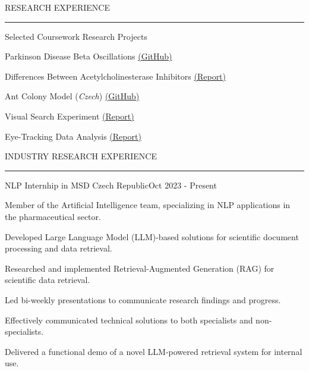 \documentclass{resume} %
\renewenvironment{rSection}[1]{
\sectionskip
\textcolor{CarnegieMellonRed}{\MakeUppercase{#1}}
\sectionlineskip
\hrule
\begin{list}{}{
\setlength{\leftmargin}{1.5em}
}
\item[]
}{
\end{list}
}
\begin{document}
\begin{rSection}{Research Experience}
\newpage

\begin{rProject}{\large Selected Coursework Research Projects}{}
{}{}{}
    \item Parkinson Disease Beta Oscillations 
    {\href{https://github.com/dbeinhauer/parkinson_disease_project}{(GitHub)}}
    \item Differences Between Acetylcholinesterase Inhibitors
    {\href{https://github.com/dbeinhauer/acetylcholinester_inhibitors/blob/main/TeX/main.pdf}{(Report)}}
    \item Ant Colony Model (\emph{Czech})
    {\href{https://github.com/dbeinhauer/ant_colony_model/tree/main}{(GitHub)}}
    \item Visual Search Experiment 
    {\href{https://raw.githack.com/dbeinhauer/visual_search_experiment/main/visual-search-experiment-report.html}{(Report)}}
    \item Eye-Tracking Data Analysis 
    {\href{https://raw.githack.com/dbeinhauer/etra_challenge/main/etra_challenge_report.html}{(Report)}}
\end{rProject}

\end{rSection}


\begin{rSection}{Industry Research Experience}
\begin{rProject}{\large NLP Internhip in MSD Czech Republic}{Oct 2023 - Present}
{}{}
    \item Member of the Artificial Intelligence team, specializing in NLP applications
    in the pharmaceutical sector.
    \item Developed Large Language Model (LLM)-based solutions for scientific document
    processing and data retrieval.
    \item Researched and implemented Retrieval-Augmented Generation (RAG) 
    for scientific data retrieval.
    \item Led bi-weekly presentations to communicate research findings and progress.
    \item Effectively communicated technical solutions to both specialists and 
    non-specialists.
    \item Delivered a functional demo of a novel LLM-powered retrieval system 
    for internal use.
\end{rProject}

\end{rSection}
\end{document}
